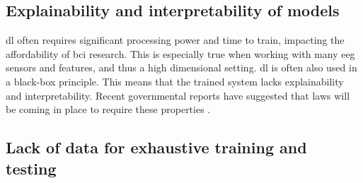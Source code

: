 
\subsection{Explainability and interpretability of models}
\label{subsec:processing_signals_common_issues_exaplainable}

\Gls{dl} often requires significant processing power and time to train, impacting the affordability of \gls{bci} research.
This is especially true when working with many \gls{eeg} sensors and features, and thus a high dimensional setting. 
\Gls{dl} is often also used in a black-box principle.
This means that the trained system lacks explainability and interpretability.
Recent governmental reports have suggested that laws will be coming in place to require these properties \citep{eu_ai_blackbox_report, explainable_ai_policy}.


\subsection{Lack of data for exhaustive training and testing}
\label{subsec:processing_signals_common_issues_generalisation}
